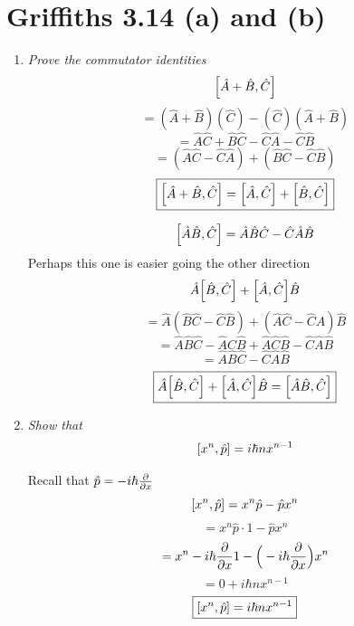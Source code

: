 \documentclass[12pt]{article}
\begin{document}
\newpage


\section*{Griffiths 3.14 (a) and (b)}

\begin{enumerate}[label=\alph*)]
\item \emph{Prove the commutator identities}
\[\comm{\hat{A}+\hat{B}}{\hat{C}}\]
\[= (\hat{A}+\hat{B})(\hat{C}) - (\hat{C})(\hat{A} + \hat{B})\]
\[= \hat{A}\hat{C} + \hat{B}\hat{C} - \hat{C}\hat{A} - \hat{C}\hat{B}\]
\[= (\hat{A}\hat{C} - \hat{C}\hat{A}) + (\hat{B}\hat{C}-\hat{C}\hat{B})\]
\[\boxed{\comm{\hat{A}+\hat{B}}{\hat{C}}= \comm{\hat{A}}{\hat{C}} + \comm{\hat{B}}{\hat{C}}}\]
\bigskip

\[\comm{\hat{A}\hat{B}}{\hat{C}} = \hat{A}\hat{B}\hat{C} - \hat{C}\hat{A}\hat{B}\]
Perhaps this one is easier going the other direction
\[\hat{A}\comm{\hat{B}}{\hat{C}} + \comm{\hat{A}}{\hat{C}}\hat{B}\]
\[= \hat{A}(\hat{B}\hat{C}-\hat{C}\hat{B}) + (\hat{A}\hat{C}-\hat{C}\hat{A})\hat{B}\]
\[=\hat{A}\hat{B}\hat{C} - \hat{A}\hat{C}\hat{B} + \hat{A}\hat{C}\hat{B} - \hat{C}\hat{A}\hat{B}\]
\[ = \hat{A}\hat{B}\hat{C} - \hat{C}\hat{A}\hat{B}\]
\[\boxed{\hat{A}\comm{\hat{B}}{\hat{C}} + \comm{\hat{A}}{\hat{C}}\hat{B} = \comm{\hat{A}\hat{B}}{\hat{C}}}\]

\item \emph{Show that}
\[\comm{x^n}{\hat{p}} = i \hbar n x^{n-1}\]\bigskip

Recall that $\hat{p} = -i \hbar \pdv{x}$
\[\comm{x^n}{\hat{p}} = x^n \hat{p} - \hat{p}x^n\]
\[= x^n \hat{p}\cdot 1 - \hat{p}x^n\]
\[= x^n -i \hbar \pdv{x} 1 - \Big(-i \hbar \pdv{x}\Big)x^n\]
\[=0 + i\hbar n x^{n-1}\]
\[\boxed{\comm{x^n}{\hat{p}} = i\hbar n x^{n-1}}\]

\end{enumerate}
\end{document}

